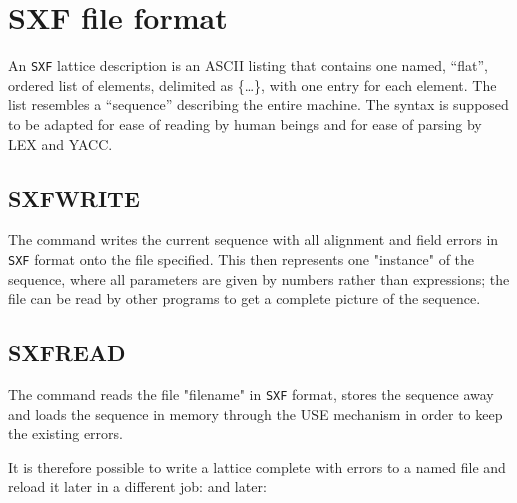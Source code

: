 
\chapter{SXF file format}
\label{chap:sxf}

An \texttt{SXF}\cite{SXF} lattice description is an ASCII listing that contains
one named, ``flat'', ordered list of elements, delimited as \{\ldots\}, with one
entry for each element. The list resembles a \madx ``sequence'' describing
the entire machine. The syntax is supposed to be adapted for ease of
reading by human beings and for ease of parsing by LEX and YACC. 

\section{SXFWRITE}
\label{sec:sxfwrite}

The command 
writes the current  sequence with all alignment and
field errors in \texttt{SXF}
format onto the file specified. This then represents one "instance" of
the sequence, where all parameters are given by numbers rather than
expressions; the file can be read by other programs to get a complete
picture of the sequence.  


\section{SXFREAD}
\label{sec:sxfread}

The command 
reads the file "filename" in \texttt{SXF} format, stores the sequence
away and loads the sequence in memory through the USE mechanism  in
order to keep the existing errors. 


It is therefore possible to write a lattice complete with errors to a
named file and reload it later in a different \madx job:
and later:


